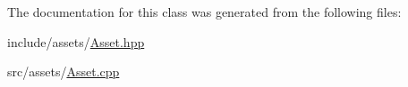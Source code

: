 The documentation for this class was generated from the following files\-:\begin{DoxyCompactItemize}
\item 
include/assets/\hyperlink{Asset_8hpp}{Asset.\-hpp}\item 
src/assets/\hyperlink{Asset_8cpp}{Asset.\-cpp}\end{DoxyCompactItemize}

